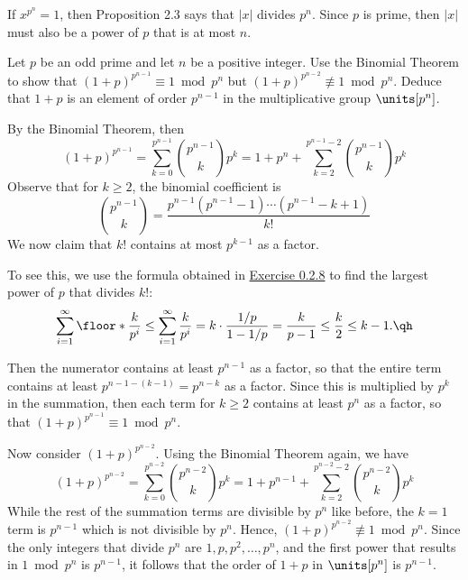 \begin{sol}
    If $x^{p^n} = 1$, then Proposition 2.3 says that $|x|$ divides $p^n$. Since $p$ is prime, then $|x|$ must also be a power of $p$ that is at most $n$.
\end{sol}

\begin{specialexercise}\label{ex2.3.21}
    Let $p$ be an odd prime and let $n$ be a positive integer. Use the Binomial Theorem to show that $(1 + p)^{p^{n - 1}} \equiv 1 \bmod p^n$ but $(1 + p)^{p^{n - 2}} \not\equiv 1 \bmod p^n$. Deduce that $1 + p$ is an element of order $p^{n - 1}$ in the multiplicative group $\units[p^n]$.
\end{specialexercise}

\begin{sol}
    By the Binomial Theorem, then
    \[(1 + p)^{p^{n - 1}} = \sum_{k = 0}^{p^{n - 1}} \binom{p^{n - 1}}k p^k = 1 + p^n + \sum_{k = 2}^{p^{n - 1} - 2} \binom{p^{n - 1}}k p^k\]
    Observe that for $k \geq 2$, the binomial coefficient is
    \[\binom{p^{n - 1}}{k} = \frac{p^{n - 1}(p^{n - 1} - 1) \cdots (p^{n - 1} - k + 1)}{k!}\]
    We now claim that $k!$ contains at most $p^{k - 1}$ as a factor. 
    \begin{lemma}
        To see this, we use the formula obtained in \hyperref[ex0.2.8]{Exercise 0.2.8} to find the largest power of $p$ that divides $k!$:
        \[\sum_{i = 1}^{\infty} \floor*{\frac{k}{p^i}} \leq \sum_{i = 1}^\infty \frac{k}{p^i} = k \cdot \frac{1/p}{1 - 1/p} = \frac{k}{p - 1} \leq \frac k2 \leq k - 1. \qh\]
    \end{lemma}
    Then the numerator contains at least $p^{n - 1}$ as a factor, so that the entire term contains at least $p^{n - 1 - (k - 1)} = p^{n - k}$ as a factor. Since this is multiplied by $p^k$ in the summation, then each term for $k \geq 2$ contains at least $p^n$ as a factor, so that $(1 + p)^{p^{n - 1}} \equiv 1 \bmod p^n$.

    Now consider $(1 + p)^{p^{n - 2}}$. Using the Binomial Theorem again, we have
    \[(1 + p)^{p^{n - 2}} = \sum_{k = 0}^{p^{n - 2}} \binom{p^{n - 2}}k p^k = 1 + p^{n - 1} + \sum_{k = 2}^{p^{n - 2} - 2} \binom{p^{n - 2}}k p^k\]
    While the rest of the summation terms are divisible by $p^n$ like before, the $k = 1$ term is $p^{n - 1}$ which is not divisible by $p^n$. Hence, $(1 + p)^{p^{n - 2}} \not\equiv 1 \bmod p^n$. Since the only integers that divide $p^n$ are $1, p, p^2, \ldots, p^n$, and the first power that results in $1 \bmod p^n$ is $p^{n - 1}$, it follows that the order of $1 + p$ in $\units[p^n]$ is $p^{n - 1}$.
\end{sol}

